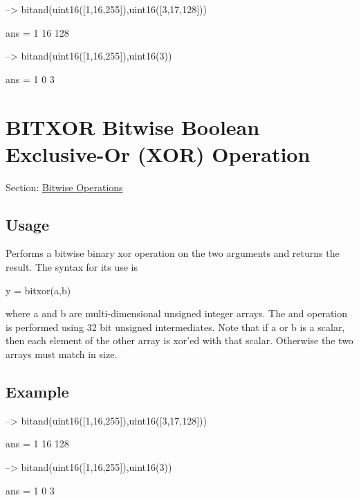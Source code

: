 \begin{DoxyVerbInclude}
--> bitand(uint16([1,16,255]),uint16([3,17,128]))

ans = 
   1  16 128 

--> bitand(uint16([1,16,255]),uint16(3))

ans = 
 1 0 3 
\end{DoxyVerbInclude}
 \hypertarget{binary_bitxor}{}\section{B\-I\-T\-X\-O\-R Bitwise Boolean Exclusive-\/\-Or (X\-O\-R) Operation}\label{binary_bitxor}
Section\-: \hyperlink{sec_binary}{Bitwise Operations} \hypertarget{vtkwidgets_vtkxyplotwidget_Usage}{}\subsection{Usage}\label{vtkwidgets_vtkxyplotwidget_Usage}
Performs a bitwise binary xor operation on the two arguments and returns the result. The syntax for its use is \begin{DoxyVerb}   y = bitxor(a,b)
\end{DoxyVerb}
 where {\ttfamily a} and {\ttfamily b} are multi-\/dimensional unsigned integer arrays. The and operation is performed using 32 bit unsigned intermediates. Note that if a or b is a scalar, then each element of the other array is xor'ed with that scalar. Otherwise the two arrays must match in size. \hypertarget{variables_struct_Example}{}\subsection{Example}\label{variables_struct_Example}

\begin{DoxyVerbInclude}
--> bitand(uint16([1,16,255]),uint16([3,17,128]))

ans = 
   1  16 128 

--> bitand(uint16([1,16,255]),uint16(3))

ans = 
 1 0 3 
\end{DoxyVerbInclude}
 